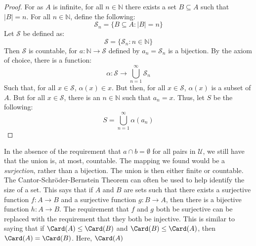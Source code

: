         \begin{proof}
            For as $A$ is infinite, for all $n\in\mathbb{N}$
            there exists a set $B\subseteq{A}$ such that
            $|B|=n$. For all $n\in\mathbb{N}$,
            define the following:
            \begin{equation}
                \mathcal{S}_{n}=\{B\subseteq{A}:|B|=n\}
            \end{equation}
            Let $\mathcal{S}$ be defined as:
            \begin{equation}
                \mathcal{S}=\{\mathcal{S}_{n}:n\in\mathbb{N}\}
            \end{equation}
            Then $\mathcal{S}$ is countable, for
            $a:\mathbb{N}\rightarrow\mathcal{S}$ defined
            by $a_{n}=\mathcal{S}_{n}$ is a bijection.
            By the axiom of choice, there is a function:
            \begin{equation}
                \alpha:\mathcal{S}\rightarrow
                \bigcup_{n=1}^{\infty}\mathcal{S}_{n}
            \end{equation}
            Such that, for all $x\in\mathcal{S}$,
            $\alpha(x)\in{x}$. But then, for all
            $x\in\mathcal{S}$, $\alpha(x)$ is a subset
            of $A$. But for all $x\in\mathcal{S}$, there
            is an $n\in\mathbb{N}$ such that
            $a_{n}=x$. Thus, let $S$ be the following:
            \begin{equation}
                S=\bigcup_{n=1}^{\infty}\alpha(a_{n})
            \end{equation}
        \end{proof}
        In the absence of the requirement that $a\cap{b}=\emptyset$ for all
        pairs in $\mathcal{U}$, we still have that the union is, at most,
        countable. The mapping we found would be a \textit{surjection}, rather
        than a bijection. The union is then either finite or countable. The
        Cantor-Schr\"{o}der-Bernstein Theorem can often be used to help identify
        the size of a set. This says that if $A$ and $B$ are sets such that
        there exists a surjective function $f:A\rightarrow{B}$ and a surjective
        function $g:B\rightarrow{A}$, then there is a bijective function
        $h:A\rightarrow{B}$. The requirement that $f$ and $g$ both be surjective
        can be replaced with the requirement that they both be injective. This
        is similar to saying that if $\Card(A)\leq\Card(B)$ and
        $\Card(B)\leq\Card(A)$, then $\Card(A)=\Card(B)$. Here, $\Card(A)$
